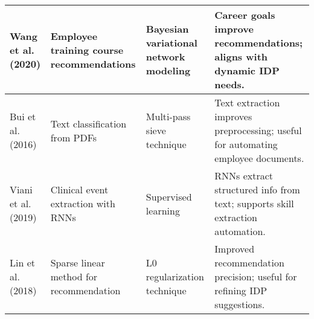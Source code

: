 \begin{leveldown}
\begin{table}[ht]
\begin{tabular}{@{}p{3cm}p{5cm}p{2cm}p{5cm}@{}}
    \midrule
    Wang et al. (2020) & Employee training course recommendations & Bayesian variational network modeling & Career goals improve recommendations; aligns with dynamic IDP needs. \\
    \midrule
    Bui et al. (2016) & Text classification from PDFs & Multi-pass sieve technique & Text extraction improves preprocessing; useful for automating employee documents. \\
    \midrule
    Viani et al. (2019) & Clinical event extraction with RNNs & Supervised learning & RNNs extract structured info from text; supports skill extraction automation. \\
    \midrule
    Lin et al. (2018) & Sparse linear method for recommendation & L0 regularization technique & Improved recommendation precision; useful for refining IDP suggestions. \\
    \bottomrule
    \end{tabular}
\end{table}

\end{leveldown}
